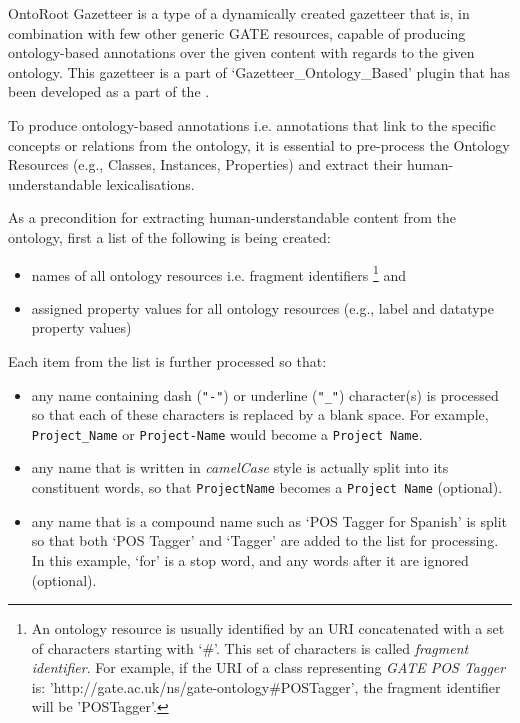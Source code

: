 OntoRoot Gazetteer is a type of a dynamically created gazetteer that
is, in combination with few other generic GATE resources, capable of
producing ontology-based annotations over the given content with
regards to the given ontology. This gazetteer is a part of
`Gazetteer\_Ontology\_Based' plugin that has been developed as a part
of the .


To produce ontology-based annotations i.e. annotations that link to the specific
concepts or relations from the ontology, it is essential to pre-process the
Ontology Resources (e.g., Classes, Instances, Properties) and extract their
human-understandable lexicalisations.

As a precondition for extracting human-understandable content from the ontology,
first a list of the following is being created:
\begin{itemize}
\item names of all ontology resources i.e. fragment identifiers
\footnote{An ontology resource is usually
identified by an URI concatenated with a set of characters starting with `\#'.
This
set of characters is called \emph{fragment identifier}. For example, if the URI
of a class representing \emph{GATE POS Tagger} is:
'http://gate.ac.uk/ns/gate-ontology\#POSTagger', the fragment identifier will be
'POSTagger'.}
 and
\item assigned property values for all ontology resources (e.g., label and
datatype property values)
\end{itemize}

Each item from the list is further processed so that:
\begin{itemize}
 \item any name containing dash (\verb+"-"+) or underline (\verb+"_"+)
character(s) is processed so
that each of these characters is replaced by a blank space. For example,
 \verb+Project_Name+ or \verb+Project-Name+
would become a \verb+Project Name+.
\item any name that is written in \emph{camelCase} style is actually split
into its constituent words, so that \verb+ProjectName+ becomes  a
\verb+Project Name+ (optional).
\item any name that is a compound name such as `POS Tagger for Spanish' is
split so that both `POS Tagger' and `Tagger' are added to the list for
processing. In this example, `for' is a stop word, and any words after it are
ignored (optional).
\end{itemize}

